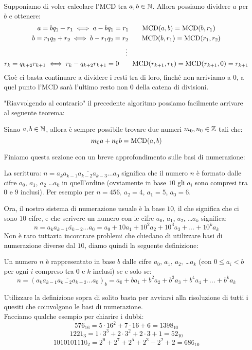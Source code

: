\documentclass[11pt]{scrartcl}
\begin{document}
	\begin{algorithm}[di Euclide]
		Supponiamo di voler calcolare l'MCD tra $a,b \in \mathbb N$. Allora possiamo dividere $a$ per $b$ e ottenere:
		\begin{gather}
			\notag a=bq_1+r_1 \iff a-bq_1=r_1  \qquad \text{MCD}(a,b)=\text{MCD}(b,r_1) \\
			\notag b=r_1q_2+r_2 \iff b-r_1q_2=r_2 \qquad \text{MCD}(b,r_1)=\text{MCD}(r_1,r_2) \\
			\notag \vdots \\
			\notag r_k=q_{k+2}r_{k+1} \iff r_k-q_{k+2}r_{k+1}=0 \qquad \text{MCD}(r_{k+1},r_k)=\text{MCD}(r_{k+1},0)=r_{k+1}
		\end{gather}
		Cioè ci basta continuare a dividere i resti tra di loro, finché non arriviamo a $0$, a quel punto l'MCD sarà l'ultimo resto non $0$ della catena di divisioni.
	\end{algorithm}
	"Riavvolgendo al contrario" il precedente algoritmo possiamo facilmente arrivare al seguente teorema:
	\begin{theorem}
		Siano $a,b \in \mathbb N$, allora è sempre possibile trovare due numeri $m_0,n_0\in \mathbb Z$ tali che:
		$$m_0a+n_0b=\text{MCD}(a,b)$$
	\end{theorem}
	Finiamo questa sezione con un breve approfondimento sulle basi di numerazione:
\begin{definition}
	La scrittura: $n=\overline{a_ka_{k-1}a_{k-2}a_{k-3}\dots a_0}$ significa che il numero $n$ è formato dalle cifre $a_0$, $a_1$, $a_2$ \dots $a_k$ in quell'ordine (ovviamente in base $10$ gli $a_i$ sono compresi tra $0$ e $9$ inclusi). Per esempio per $n=456$, $a_2=4$, $a_1=5$, $a_0=6$.
\end{definition}
	Ora, il nostro sistema di numerazione usuale è la base $10$, il che significa che ci sono $10$ cifre, e che scrivere un numero con le cifre $a_0$, $a_1$, $a_2$, \dots $a_k$ significa:
	$$n=\overline{a_ka_{k-1}a_{k-2}\dots a_0}=a_0+10a_1+10^2a_2+10^3a_3+\dots+10^ka_k$$
	Non è raro tuttavia incontrare problemi che chiedano di utilizzare basi di numerazione diverse dal $10$, diamo quindi la seguente definizione:
	\begin{definition}
		Un numero $n$ è rappresentato in base $b$ dalle cifre $a_0$, $a_1$, $a_2$, \dots $a_k$ (con $0\le a_i<b$ per ogni $i$ compreso tra $0$ e $k$ inclusi) se e solo se:
		$$n=(\overline{a_ka_{k-1}a_{k-2}a_{k-3}\dots a_0})_b=a_0+ba_1+b^2a_2+b^3a_3+b^4a_4+\dots +b^ka_k$$
	\end{definition}
	Utilizzare la definizione sopra di solito basta per avviarsi alla risoluzione di tutti i quesiti che coinvolgono le basi di numerazione. \\
	Facciamo qualche esempio per chiarire i dubbi:
	$$576_{16}=5\cdot16^2+7\cdot16+6=1398_{10}$$
	$$1221_3=1\cdot3^3+2\cdot3^2+2\cdot3+1=52_{10}$$
	$$1010101110_2=2^9+2^7+2^5+2^3+2^2+2=686_{10}$$
\end{document}
